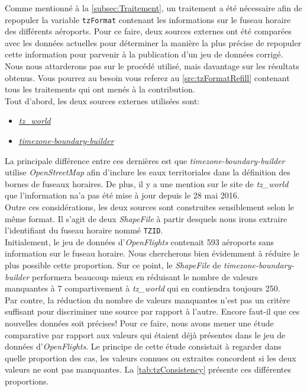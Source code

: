Comme mentionné à la \autoref{subsec:Traitement}, un traitement a été nécessaire afin de repopuler la variable \texttt{tzFormat} contenant les informations sur le fuseau horaire des différents aéroports. Pour ce faire, deux sources externes ont été comparées avec les données actuelles pour déterminer la manière la plus précise de repopuler cette information pour parvenir à la publication d'un jeu de données corrigé. Nous nous attarderons pas sur le procédé utilisé, mais davantage sur les résultats obtenus. Vous pourrez au besoin vous referez au \autoref{src:tzFormatRefill} contenant tous les traitements qui ont menés à la contribution. \\

Tout d'abord, les deux sources externes utilisées sont:
\begin{itemize}
	\item \href{http://efele.net/maps/tz/world/}{\emph{tz\_world}}
	\item \href{https://github.com/evansiroky/timezone-boundary-builder}{\emph{{timezone-boundary-builder}}}
\end{itemize}
La principale différence entre ces dernières est que \emph{{timezone-boundary-builder}} utilise \emph{OpenStreetMap} afin d'inclure les eaux territoriales dans la définition des bornes de fuseaux horaires. De plus, il y a une mention sur le site de \emph{tz\_world} que l'information na'a pas été mise à jour depuis le 28 mai 2016. \\

Outre ces considérations, les deux sources sont construites sensiblement selon le même format. Il s'agit de deux \emph{ShapeFile} à partir desquels nous irons extraire l'identifiant du fuseau horaire nommé \texttt{TZID}. \\

Initialement, le jeu de données d'\emph{OpenFlights} contenait 593 aéroports sans information sur le fuseau horaire. Nous chercherons bien évidemment à réduire le plus possible cette proportion. Sur ce point, le \emph{ShapeFile} de \emph{{timezone-boundary-builder}} performera beaucoup mieux en réduisant le nombre de valeurs manquantes à 7 compartivement à \emph{tz\_world} qui en contiendra toujours 250. \\

Par contre, la réduction du nombre de valeurs manquantes n'est pas un critère suffisant pour discriminer une source par rapport à l'autre. Encore faut-il que ces nouvelles données soit précises! Pour ce faire, nous avons mener une étude comparative par rapport aux valeurs qui étaient déjà présentes dans le jeu de données d'\emph{OpenFlights}. Le principe de cette étude consistait à regarder dans quelle proportion des cas, les valeurs connues ou extraites concordent si les deux valeurs ne sont pas manquantes. La \autoref{tab:tzConsistency} présente ces différentes proportions. \\

